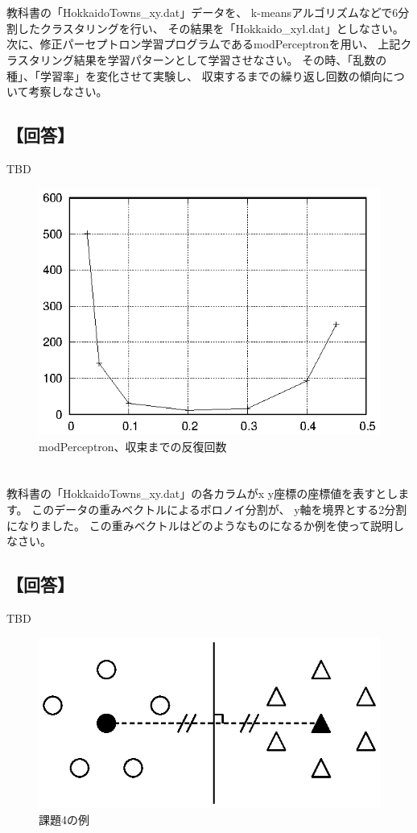 \documentclass[a4j]{jarticle}
\begin{document}
\section{}
教科書の「HokkaidoTowns\_xy\@.dat」データを、
k-meansアルゴリズムなどで6分割したクラスタリングを行い、
その結果を「Hokkaido\_xyl\@.dat」としなさい。
次に、修正パーセプトロン学習プログラムであるmodPerceptronを用い、
上記クラスタリング結果を学習パターンとして学習させなさい。
その時、「乱数の種」、「学習率」を変化させて実験し、
収束するまでの繰り返し回数の傾向について考察しなさい。

\subsection{【回答】}
TBD

\begin{figure}[tbp]
 \begin{center}
  \includegraphics[width=0.5\hsize]{fig/modPerceptron.eps}
 \end{center}
 \caption{modPerceptron、収束までの反復回数}
 \label{fig:modPerceptron}
\end{figure}


\section{}
教科書の「HokkaidoTowns\_xy\@.dat」の各カラムがx y座標の座標値を表すとします。
このデータの重みベクトルによるボロノイ分割が、
y軸を境界とする2分割になりました。
この重みベクトルはどのようなものになるか例を使って説明しなさい。

\subsection{【回答】}
TBD

\begin{figure}[tbp]
 \begin{center}
  \includegraphics[width=0.5\hsize]{fig/problem04.eps}
 \end{center}
 \caption{課題4の例}
 \label{fig:problem04}
\end{figure}
\end{document}
